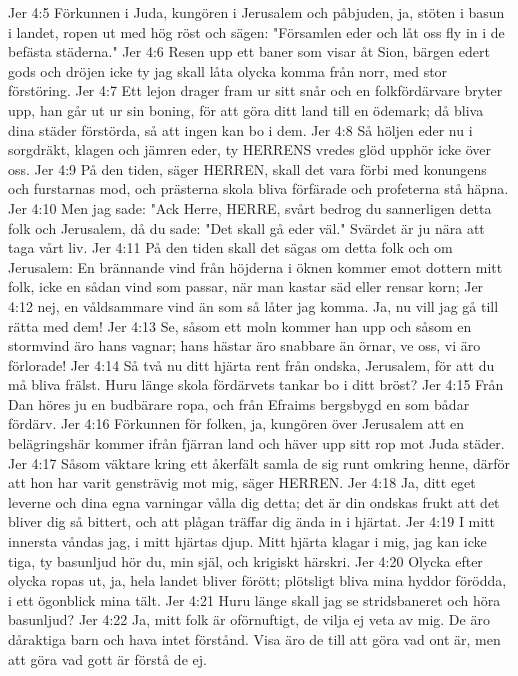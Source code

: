 Jer 4:5  Förkunnen i Juda, kungören i Jerusalem och påbjuden, ja, stöten i basun i landet, ropen ut med hög röst och sägen: "Församlen eder och låt oss fly in i de befästa städerna."
Jer 4:6  Resen upp ett baner som visar åt Sion, bärgen edert gods och dröjen icke ty jag skall låta olycka komma från norr, med stor förstöring.
Jer 4:7  Ett lejon drager fram ur sitt snår och en folkfördärvare bryter upp, han går ut ur sin boning, för att göra ditt land till en ödemark; då bliva dina städer förstörda, så att ingen kan bo i dem.
Jer 4:8  Så höljen eder nu i sorgdräkt, klagen och jämren eder, ty HERRENS vredes glöd upphör icke över oss.
Jer 4:9  På den tiden, säger HERREN, skall det vara förbi med konungens och furstarnas mod, och prästerna skola bliva förfärade och profeterna stå häpna.
Jer 4:10  Men jag sade: "Ack Herre, HERRE, svårt bedrog du sannerligen detta folk och Jerusalem, då du sade: "Det skall gå eder väl." Svärdet är ju nära att taga vårt liv.
Jer 4:11  På den tiden skall det sägas om detta folk och om Jerusalem: En brännande vind från höjderna i öknen kommer emot dottern mitt folk, icke en sådan vind som passar, när man kastar säd eller rensar korn;
Jer 4:12  nej, en våldsammare vind än som så låter jag komma. Ja, nu vill jag gå till rätta med dem!
Jer 4:13  Se, såsom ett moln kommer han upp och såsom en stormvind äro hans vagnar; hans hästar äro snabbare än örnar, ve oss, vi äro förlorade!
Jer 4:14  Så två nu ditt hjärta rent från ondska, Jerusalem, för att du må bliva frälst. Huru länge skola fördärvets tankar bo i ditt bröst?
Jer 4:15  Från Dan höres ju en budbärare ropa, och från Efraims bergsbygd en som bådar fördärv.
Jer 4:16  Förkunnen för folken, ja, kungören över Jerusalem att en belägringshär kommer ifrån fjärran land och häver upp sitt rop mot Juda städer.
Jer 4:17  Såsom väktare kring ett åkerfält samla de sig runt omkring henne, därför att hon har varit gensträvig mot mig, säger HERREN.
Jer 4:18  Ja, ditt eget leverne och dina egna varningar vålla dig detta; det är din ondskas frukt att det bliver dig så bittert, och att plågan träffar dig ända in i hjärtat.
Jer 4:19  I mitt innersta våndas jag, i mitt hjärtas djup. Mitt hjärta klagar i mig, jag kan icke tiga, ty basunljud hör du, min själ, och krigiskt härskri.
Jer 4:20  Olycka efter olycka ropas ut, ja, hela landet bliver förött; plötsligt bliva mina hyddor förödda, i ett ögonblick mina tält.
Jer 4:21  Huru länge skall jag se stridsbaneret och höra basunljud?
Jer 4:22  Ja, mitt folk är oförnuftigt, de vilja ej veta av mig. De äro dåraktiga barn och hava intet förstånd. Visa äro de till att göra vad ont är, men att göra vad gott är förstå de ej.
